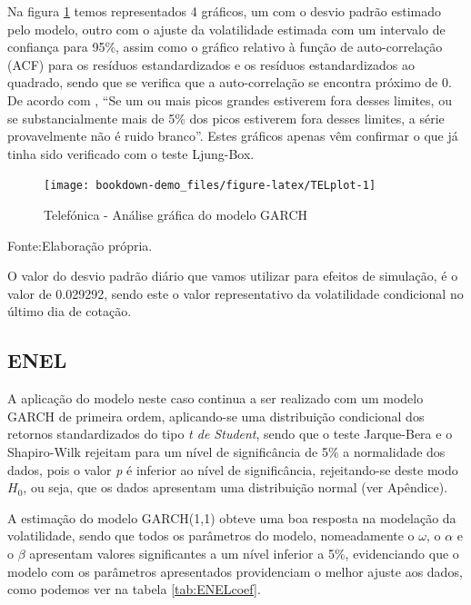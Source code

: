 \documentclass[
  12pt,
  a4paper,
  openany]{book}
\theoremstyle{definition}
\theoremstyle{definition}
\theoremstyle{definition}
\theoremstyle{remark}
\begin{document}
\justifying
\bigskip

Na figura \ref{fig:TELplot} temos representados 4 gráficos, um com o desvio padrão estimado pelo modelo, outro com o ajuste da volatilidade estimada com um intervalo de confiança para 95\%, assim como o gráfico relativo à função de auto-correlação (ACF) para os resíduos estandardizados e os resíduos estandardizados ao quadrado, sendo que se verifica que a auto-correlação se encontra próximo de 0. De acordo com \citet{foregeorge}, ``Se um ou mais picos grandes estiverem fora desses limites, ou se substancialmente mais de 5\% dos picos estiverem fora desses limites, a série provavelmente não é ruido branco''. Estes gráficos apenas vêm confirmar o que já tinha sido verificado com o teste Ljung-Box.

\begin{figure}

{\centering \texttt{[image: bookdown-demo\_files/figure-latex/TELplot-1]} 

}

\caption{Telefónica - Análise gráfica do modelo GARCH}\label{fig:TELplot}
\end{figure}
\FloatBarrier
\centering

Fonte:Elaboração própria.

\justifying
\bigskip

O valor do desvio padrão diário que vamos utilizar para efeitos de simulação, é o valor de 0.029292, sendo este o valor representativo da volatilidade condicional no último dia de cotação.

\hypertarget{enel}{%
\subsection{ENEL}\label{enel}}

A aplicação do modelo neste caso continua a ser realizado com um modelo GARCH de primeira ordem, aplicando-se uma distribuição condicional dos retornos standardizados do tipo \emph{t de Student}, sendo que o teste Jarque-Bera e o Shapiro-Wilk rejeitam para um nível de significância de 5\% a normalidade dos dados, pois o valor \emph{p} é inferior ao nível de significância, rejeitando-se deste modo \(H_0\), ou seja, que os dados apresentam uma distribuição normal (ver Apêndice).

A estimação do modelo GARCH(1,1) obteve uma boa resposta na modelação da volatilidade, sendo que todos os parâmetros do modelo, nomeadamente o \(\omega\), o \(\alpha\) e o \(\beta\) apresentam valores significantes a um nível inferior a 5\%, evidenciando que o modelo com os parâmetros apresentados providenciam o melhor ajuste aos dados, como podemos ver na tabela \ref{tab:ENELcoef}.
\end{document}
